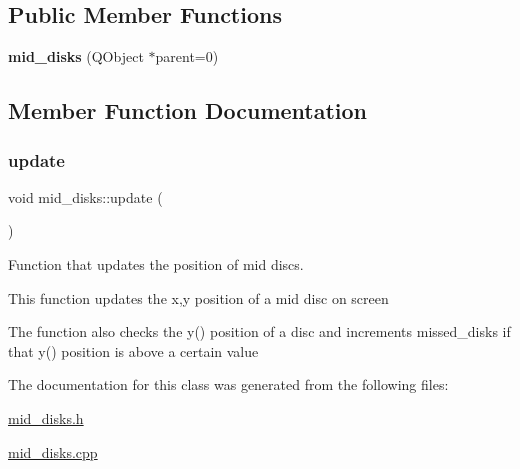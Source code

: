 \subsection*{Public Member Functions}
\begin{DoxyCompactItemize}
\item 
\mbox{\label{classmid__disks_a2a283183a343ba601007b002354d59cd}} 
{\bfseries mid\+\_\+disks} (Q\+Object $\ast$parent=0)
\end{DoxyCompactItemize}


\subsection{Member Function Documentation}
\mbox{\label{classmid__disks_aaf3ee8a13a79381553589e54b92b691c}} 
\subsubsection{\texorpdfstring{update}{update}}
{\footnotesize\ttfamily void mid\+\_\+disks\+::update (\begin{DoxyParamCaption}{ }\end{DoxyParamCaption})\hspace{0.3cm}{\ttfamily [slot]}}



Function that updates the position of mid discs. 

This function updates the x,y position of a mid disc on screen

The function also checks the y() position of a disc and increments missed\+\_\+disks if that y() position is above a certain value 

The documentation for this class was generated from the following files\+:\begin{DoxyCompactItemize}
\item 
\hyperlink{mid__disks_8h}{mid\+\_\+disks.\+h}\item 
\hyperlink{mid__disks_8cpp}{mid\+\_\+disks.\+cpp}\end{DoxyCompactItemize}
